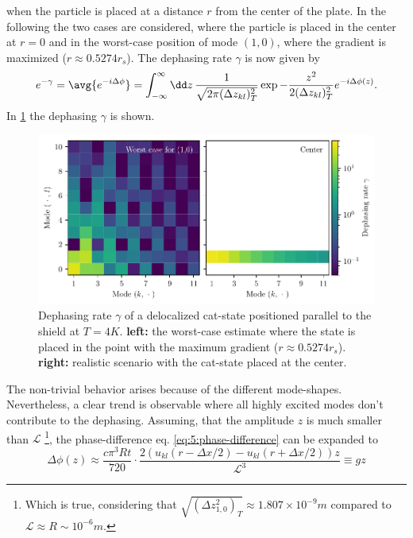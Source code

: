 when the particle is placed at a distance $r$ from the center of the plate. In the following the two cases are considered, where the particle is placed in the center at $r=0$ and in the worst-case position of mode $(1,0)$, where the gradient is maximized ($r \approx 0.5274 r_s$).
The dephasing rate $\gamma$ is now given by
\begin{equation}\label{eq:5:average-dephasing}
  e^{-\gamma} = \avg{e^{-i\Delta\phi}} = \int_{-\infty}^{\infty} \dd z \, \frac{1}{\sqrt{2 \pi (\Delta z_{kl})_T^2}} \exp{-\frac{z^2}{2 (\Delta z_{kl})_T^2}} e^{-i \Delta\phi(z)} .
\end{equation}
In \cref{fig:5:dephasing} the dephasing $\gamma$ is shown.
\begin{figure}[!htbp]
  \centering
  \includegraphics[width=\textwidth]{./../figures/vibrations/vibrational-dephasing-rate.pdf}
  \caption{Dephasing rate $\gamma$ of a delocalized cat-state positioned parallel to the shield at $T=4\si{K}$. \textbf{left:} the worst-case estimate where the state is placed in the point with the maximum gradient ($r\approx 0.5274 r_s$). \textbf{right:} realistic scenario with the cat-state placed at the center.}
  \label{fig:5:dephasing}
\end{figure}
The non-trivial behavior arises because of the different mode-shapes. Nevertheless, a clear trend is observable where all highly excited modes don't contribute to the dephasing.
Assuming, that the amplitude $z$ is much smaller than $\mathscr{L}$ \footnote{Which is true, considering that $\sqrt{(\Delta z_{1,0}^2)_T}\approx 1.807 \times 10^{-9}\si{m}$ compared to $\mathscr{L} \approx R \sim 10^{-6}\si{m}$.}, the phase-difference eq. \eqref{eq:5:phase-difference} can be expanded to
\begin{equation}
  \Delta\phi(z) \approx \frac{c \pi^3 R t}{720} \cdot \frac{2\left(u_{kl}(r - \Delta x/2) -u_{kl}(r + \Delta x/2)\right)z}{\mathscr{L}^3} \equiv g z
\end{equation}
